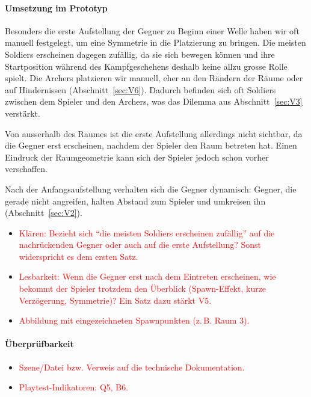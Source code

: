 \documentclass[../Main.tex]{subfiles}
\begin{document}
\paragraph{Umsetzung im Prototyp}
Besonders die erste Aufstellung der Gegner zu Beginn einer Welle haben wir oft manuell festgelegt, um eine Symmetrie in die Platzierung zu bringen. Die meisten Soldiers erscheinen dagegen zufällig, da sie sich bewegen können und ihre Startposition während des Kampfgeschehens deshalb keine allzu grosse Rolle spielt. Die Archers platzieren wir manuell, eher an den Rändern der Räume oder auf Hindernissen (Abschnitt~\ref{sec:V6}). Dadurch befinden sich oft Soldiers zwischen dem Spieler und den Archers, was das Dilemma aus Abschnitt~\ref{sec:V3} verstärkt.

Von ausserhalb des Raumes ist die erste Aufstellung allerdings nicht sichtbar, da die Gegner erst erscheinen, nachdem der Spieler den Raum betreten hat. Einen Eindruck der Raumgeometrie kann sich der Spieler jedoch schon vorher verschaffen.

Nach der Anfangsaufstellung verhalten sich die Gegner dynamisch: Gegner, die gerade nicht angreifen, halten Abstand zum Spieler und umkreisen ihn (Abschnitt~\ref{sec:V2}).

\begin{itemize}[leftmargin=1.5cm]
    \item \textcolor{red}{Klären: Bezieht sich \enquote{die meisten Soldiers erscheinen zufällig} auf die nachrückenden Gegner oder auch auf die erste Aufstellung? Sonst widerspricht es dem ersten Satz.}
    \item \textcolor{red}{Lesbarkeit: Wenn die Gegner erst nach dem Eintreten erscheinen, wie bekommt der Spieler trotzdem den Überblick (Spawn-Effekt, kurze Verzögerung, Symmetrie)? Ein Satz dazu stärkt V5.}
    \item \textcolor{red}{Abbildung mit eingezeichneten Spawnpunkten (z.\,B. Raum 3).}
\end{itemize}

\paragraph{Überprüfbarkeit}
\begin{itemize}[leftmargin=1.5cm]
    \item \textcolor{red}{Szene/Datei bzw. Verweis auf die technische Dokumentation.}
    \item \textcolor{red}{Playtest-Indikatoren: Q5, B6.}
\end{itemize}
\end{document}
